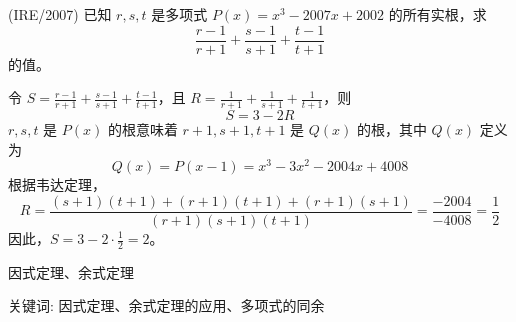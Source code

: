 \begin{questions}
\question (IRE/2007) 已知 $r, s, t$ 是多项式 $P(x) = x^3 - 2007x + 2002$ 的所有实根，求
\[
\frac{r - 1}{r + 1} + \frac{s - 1}{s + 1} + \frac{t - 1}{t + 1}
\]
的值。

\begin{solution}
令 $S = \frac{r - 1}{r + 1} + \frac{s - 1}{s + 1} + \frac{t - 1}{t + 1}$，且 $R = \frac{1}{r + 1} + \frac{1}{s + 1} + \frac{1}{t + 1}$，则
\[
S = 3 - 2R
\]
$r, s, t$ 是 $P(x)$ 的根意味着 $r + 1, s + 1, t + 1$ 是 $Q(x)$ 的根，其中 $Q(x)$ 定义为
\[
Q(x) = P(x - 1) = x^3 - 3x^2 - 2004x + 4008
\]
根据韦达定理，
\[
R = \frac{(s + 1)(t + 1) + (r + 1)(t + 1) + (r + 1)(s + 1)}{(r + 1)(s + 1)(t + 1)} = \frac{-2004}{-4008} = \frac{1}{2}
\]
因此，$S = 3 - 2 \cdot \frac{1}{2} = 2$。
\end{solution}
\end{questions}
\pagebreak

\begin{center}
  {\fontsize{30pt}{26pt}\selectfont
    \hypertarget{因式定理、余式定理}{因式定理、余式定理} \label{因式定理、余式定理}
  }
\end{center}
\separator
\begin{center}
    关键词: 因式定理、余式定理的应用、多项式的同余
\end{center}
\vspace{0.5pt}

